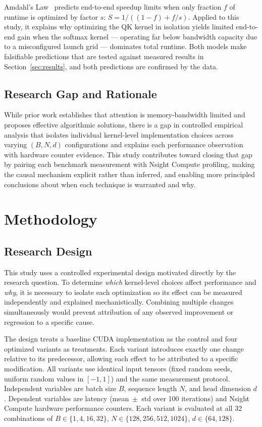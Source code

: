\documentclass{article}
\begin{document}
Amdahl's Law~\cite{amdahl1967validity} predicts end-to-end speedup limits
when only fraction $f$ of runtime is optimized by factor $s$:
$S = 1/((1-f)+f/s)$. Applied to this study, it explains why optimizing the
QK kernel in isolation yields limited end-to-end gain when the softmax kernel
— operating far below bandwidth capacity due to a misconfigured launch grid
— dominates total runtime. Both models make falsifiable predictions that are
tested against measured results in Section~\ref{sec:results}, and both
predictions are confirmed by the data.

\subsection{Research Gap and Rationale}

While prior work establishes that attention is memory-bandwidth limited and
proposes effective algorithmic solutions, there is a gap in controlled
empirical analysis that isolates individual kernel-level implementation
choices across varying $(B,N,d)$ configurations and explains each performance
observation with hardware counter evidence. This study contributes toward
closing that gap by pairing each benchmark measurement with Nsight Compute
profiling, making the causal mechanism explicit rather than inferred, and
enabling more principled conclusions about when each technique is warranted
and why.

\section{Methodology}
\label{sec:method}

\subsection{Research Design}

This study uses a controlled experimental design motivated directly by the
research question. To determine \textit{which} kernel-level choices affect
performance and \textit{why}, it is necessary to isolate each optimization so
its effect can be measured independently and explained mechanistically.
Combining multiple changes simultaneously would prevent attribution of any
observed improvement or regression to a specific cause.

The design treats a baseline CUDA implementation as the control and four
optimized variants as treatments. Each variant introduces exactly one change
relative to its predecessor, allowing each effect to be attributed to a
specific modification. All variants use identical input tensors (fixed random
seeds, uniform random values in $[-1,1]$) and the same measurement protocol.
Independent variables are batch size $B$, sequence length $N$, and head
dimension $d$. Dependent variables are latency (mean~$\pm$~std over 100
iterations) and Nsight Compute hardware performance counters. Each variant
is evaluated at all 32 combinations of $B\in\{1,4,16,32\}$,
$N\in\{128,256,512,1024\}$, $d\in\{64,128\}$.
\end{document}

